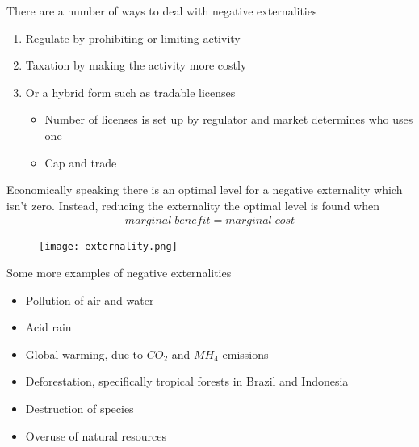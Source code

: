 \documentclass{beamer}
\begin{document}
\begin{frame}
  There are a number of ways to deal with negative externalities
  \begin{enumerate}
    \item Regulate by prohibiting or limiting activity
    \item Taxation by making the activity more costly
    \item Or a hybrid form such as tradable licenses
    \begin{itemize}
      \item Number of licenses is set up by regulator and market determines who uses one
      \item Cap and trade
    \end{itemize}
  \end{enumerate}
\end{frame}

\begin{frame}
 Economically speaking there is an optimal level for a negative externality which isn't zero. 
 Instead, reducing the externality the optimal level is found when 
 \begin{align*}
   marginal\; benefit = marginal\; cost
 \end{align*}
 \begin{figure}
   \texttt{[image: externality.png]}
 \end{figure}
 \end{frame}

\begin{frame}
 Some more examples of negative externalities
 \begin{itemize}
   \item Pollution of air and water
   \item Acid rain
   \item Global warming, due to $CO_2$ and $MH_4$ emissions
   \item Deforestation, specifically tropical forests in Brazil and Indonesia
   \item Destruction of species
   \item Overuse of natural resources 
 \end{itemize}
\end{frame}
\end{document}
